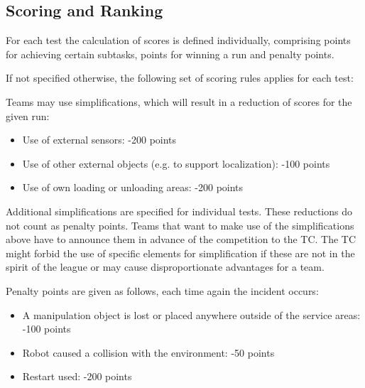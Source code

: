\subsection{Scoring and Ranking} \label{ssec:ScoringAndRanking}
For each test the calculation of scores is defined individually, comprising points for achieving certain subtasks, points for winning a run and penalty points.
\par
If not specified otherwise, the following set of scoring rules applies for each test:
\par
Teams may use simplifications, which will result in a reduction of scores for the given run:

\begin{itemize}
	\item Use of external sensors: \hfill -200 points
	\item Use of other external objects (e.g. to support localization): \hfill -100 points
	\item Use of own loading or unloading areas: \hfill -200 points
\end{itemize}

Additional simplifications are specified for individual tests. These reductions do not count as penalty points. Teams that want to make use of the simplifications above have to announce them in advance of the competition to the TC. The TC might forbid the use of specific elements for simplification if these are not in the spirit of the league or may cause disproportionate advantages for a team.
\par
Penalty points are given as follows, each time again the incident occurs:

\begin{itemize}
	\item A manipulation object is lost or placed anywhere outside of the service areas: \hfill -100 points
	\item Robot caused a collision with the environment: \hfill -50 points
	\item Restart used: \hfill -200 points
\end{itemize}

